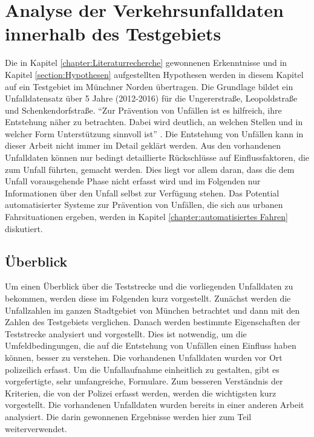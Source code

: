 
\chapter{Analyse der Verkehrsunfalldaten innerhalb des Testgebiets}\label{chapter:Datenauswertung}
Die in Kapitel \ref{chapter:Literaturrecherche} gewonnenen Erkenntnisse und in Kapitel \ref{section:Hypothesen} aufgestellten Hypothesen werden in diesem Kapitel auf ein Testgebiet im Münchner Norden übertragen. Die Grundlage bildet ein Unfalldatensatz über 5 Jahre (2012-2016) für die Ungererstraße, Leopoldstraße und Schenkendorfstraße. \enquote{Zur Prävention von Unfällen ist es hilfreich, ihre Entstehung näher zu betrachten. Dabei wird deutlich, an welchen Stellen und in welcher Form Unterstützung sinnvoll ist} \parencite[S. 43]{Fricke.2006}. Die Entstehung von Unfällen kann in dieser Arbeit nicht immer im Detail geklärt werden. Aus den vorhandenen Unfalldaten können nur bedingt detaillierte Rückschlüsse auf Einflussfaktoren, die zum Unfall führten, gemacht werden. Dies liegt vor allem daran, dass die dem Unfall vorausgehende Phase nicht erfasst wird und im Folgenden nur Informationen über den Unfall selbst zur Verfügung stehen. Das Potential automatisierter Systeme zur Prävention von Unfällen, die sich aus urbanen Fahrsituationen ergeben, werden in Kapitel \ref{chapter:automatisiertes Fahren} diskutiert.

\section{Überblick}\label{section:Überblick}
Um einen Überblick über die Teststrecke und die vorliegenden Unfalldaten zu bekommen, werden diese im Folgenden kurz vorgestellt. Zunächst werden die Unfallzahlen im ganzen Stadtgebiet von München betrachtet und dann mit den Zahlen des Testgebiets verglichen. Danach werden bestimmte Eigenschaften der Teststrecke analysiert und vorgestellt. Dies ist notwendig, um die Umfeldbedingungen, die auf die Entstehung von Unfällen einen Einfluss haben können, besser zu verstehen. Die vorhandenen Unfalldaten wurden vor Ort polizeilich erfasst. Um die Unfallaufnahme einheitlich zu gestalten, gibt es vorgefertigte, sehr umfangreiche, Formulare. Zum besseren Verständnis der Kriterien, die von der Polizei erfasst werden, werden die wichtigsten kurz vorgestellt. Die vorhandenen Unfalldaten wurden bereits in einer anderen Arbeit analysiert. Die darin gewonnenen Ergebnisse werden hier zum Teil weiterverwendet.

